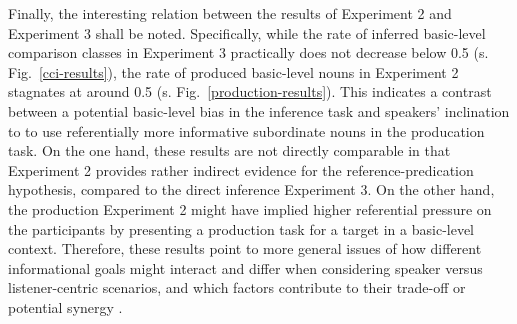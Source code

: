 Finally, the interesting relation between the results of Experiment 2 and Experiment 3 shall be noted. Specifically, while the rate of inferred basic-level comparison classes in Experiment 3 practically does not decrease below 0.5 (s. Fig.~\ref{cci-results}), the rate of produced basic-level nouns in Experiment 2 stagnates at around 0.5 (s. Fig.~\ref{production-results}). This indicates a contrast between a potential basic-level bias in the inference task and speakers' inclination to to use referentially more informative subordinate nouns in the producation task. On the one hand, these results are not directly comparable in that Experiment 2 provides rather indirect evidence for the reference-predication hypothesis, compared to the direct inference Experiment 3. On the other hand, the production Experiment 2 might have implied higher referential pressure on the participants by presenting a production task for a target in a basic-level context. Therefore, these results point to more general issues of how different informational goals might interact and differ when considering speaker versus listener-centric scenarios, and which factors contribute to their trade-off or potential synergy \parencite[cf.][]{heller2008role}.  
